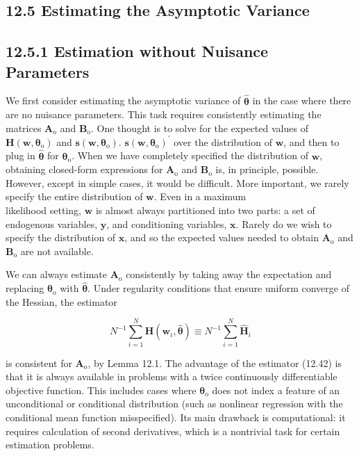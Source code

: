 \documentclass[10pt]{article}
\begin{document}
\subsection*{12.5 Estimating the Asymptotic Variance}
\subsection*{12.5.1 Estimation without Nuisance Parameters}
We first consider estimating the asymptotic variance of $\hat{\boldsymbol{\theta}}$ in the case where there are no nuisance parameters. This task requires consistently estimating the matrices $\mathbf{A}_{\mathrm{o}}$ and $\mathbf{B}_{\mathrm{o}}$. One thought is to solve for the expected values of $\mathbf{H}\left(\mathbf{w}, \boldsymbol{\theta}_{\mathrm{o}}\right)$ and $\mathbf{s}\left(\mathbf{w}, \boldsymbol{\theta}_{\mathrm{o}}\right)$. $\mathbf{s}\left(\mathbf{w}, \boldsymbol{\theta}_{\mathrm{o}}\right)^{\prime}$ over the distribution of $\mathbf{w}$, and then to plug in $\hat{\boldsymbol{\theta}}$ for $\boldsymbol{\theta}_{\mathrm{o}}$. When we have completely specified the distribution of $\mathbf{w}$, obtaining closed-form expressions for $\mathbf{A}_{\mathrm{o}}$ and $\mathbf{B}_{\mathrm{o}}$ is, in principle, possible. However, except in simple cases, it would be difficult. More important, we rarely specify the entire distribution of $\mathbf{w}$. Even in a maximum\\
likelihood setting, $\mathbf{w}$ is almost always partitioned into two parts: a set of endogenous variables, $\mathbf{y}$, and conditioning variables, $\mathbf{x}$. Rarely do we wish to specify the distribution of $\mathbf{x}$, and so the expected values needed to obtain $\mathbf{A}_{\mathrm{o}}$ and $\mathbf{B}_{\mathrm{o}}$ are not available.

We can always estimate $\mathbf{A}_{\mathrm{o}}$ consistently by taking away the expectation and replacing $\boldsymbol{\theta}_{\mathrm{o}}$ with $\hat{\boldsymbol{\theta}}$. Under regularity conditions that ensure uniform converge of the Hessian, the estimator


\begin{equation*}
N^{-1} \sum_{i=1}^{N} \mathbf{H}\left(\mathbf{w}_{i}, \hat{\boldsymbol{\theta}}\right) \equiv N^{-1} \sum_{i=1}^{N} \hat{\mathbf{H}}_{i} \tag{12.42}
\end{equation*}


is consistent for $\mathbf{A}_{\mathrm{o}}$, by Lemma 12.1. The advantage of the estimator (12.42) is that it is always available in problems with a twice continuously differentiable objective function. This includes cases where $\boldsymbol{\theta}_{\mathrm{o}}$ does not index a feature of an unconditional or conditional distribution (such as nonlinear regression with the conditional mean function misspecified). Its main drawback is computational: it requires calculation of second derivatives, which is a nontrivial task for certain estimation problems.
\end{document}
